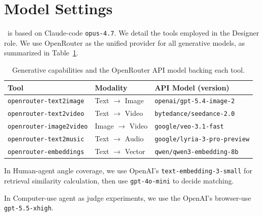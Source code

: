 \section{Model Settings}
\label{sec:app:setup}

\method~is based on Claude-code \texttt{opus-4.7}.
We detail the tools employed in the Designer role. We use OpenRouter as the unified provider for all generative models, as summarized in Table~\ref{tab:abilities}.

\begin{table}[!h]
    \centering
    \caption{Generative capabilities and the OpenRouter API model backing each tool.}
    \label{tab:abilities}
    \begin{tabular}{@{}lll@{}}
      \toprule
      \textbf{Tool} & \textbf{Modality} & \textbf{API Model (version)} \\
      \midrule
      \texttt{openrouter-text2image}   & Text $\rightarrow$ Image  & \texttt{openai/gpt-5.4-image-2} \\
      \texttt{openrouter-text2video}   & Text $\rightarrow$ Video  & \texttt{bytedance/seedance-2.0} \\
      \texttt{openrouter-image2video}  & Image $\rightarrow$ Video & \texttt{google/veo-3.1-fast} \\
      \texttt{openrouter-text2music}   & Text $\rightarrow$ Audio  & \texttt{google/lyria-3-pro-preview} \\
      \texttt{openrouter-embeddings}   & Text $\rightarrow$ Vector & \texttt{qwen/qwen3-embedding-8b} \\
      \bottomrule
    \end{tabular}
\end{table}

In Human-agent angle coverage, we use OpenAI’s \texttt{text-embedding-3-small} for retrieval similarity calculation, then use \texttt{gpt-4o-mini} to decide matching.

In Computer-use agent as judge experiments, we use the OpenAI’s browser-use \texttt{gpt-5.5-xhigh}.